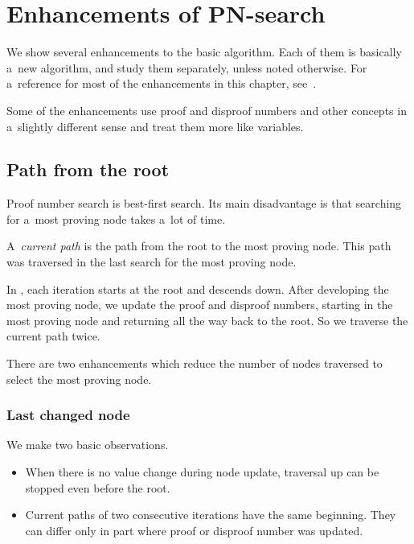 \section{Enhancements of PN-search}

We show several enhancements to the basic  algorithm. Each
of them is basically a~new algorithm, and study them separately,
unless noted otherwise. For a~reference for most of the enhancements
in this chapter, see~\cite{allis}.

Some of the enhancements use proof and disproof numbers and other concepts
in a~slightly different sense and treat them more like variables. 

\subsection{Path from the root}

Proof number search is best-first search. Its main disadvantage is that
searching for a~most proving node takes a~lot of time. 

\begin{theorem}
	A~{\sl current path} is the path from the root to the most proving node.
	This path was traversed in the last search for the most proving node.
\end{theorem}

In , each iteration starts at the root and descends down. After developing
the most proving node, we update the proof and disproof numbers, starting in the most proving node and 
returning all the way back to the root. So we traverse the current path twice. 

There are two enhancements which reduce the number of nodes traversed to select the
most proving node. 

\subsubsection{Last changed node} \label{last}

We make two basic observations.
\begin{itemize}
\item When there is no value change during node update, traversal up can be stopped even before the root.
\item Current paths of two consecutive iterations have the same beginning. They can differ
only in part where proof or disproof number was updated.
\end{itemize}

